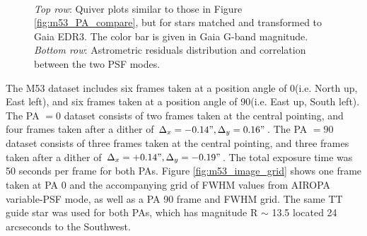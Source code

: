 \documentclass[]{spie}  %
\begin{document}
\begin{figure}[!h]
  \centering
  \\
  \hspace{-1cm}
  \caption{\textit{Top row}: Quiver plots similar to those in Figure \ref{fig:m53_PA_compare}, but for stars matched and transformed to Gaia EDR3. The color bar is given in Gaia G-band magnitude. \textit{Bottom row}: Astrometric residuals distribution and correlation between the two PSF modes.} \label{fig:m53_PA_compare_hst}
\end{figure}

The M53 dataset includes six frames taken at a position angle of 0\degree (i.e. North up, East left), and six frames taken at a position angle of 90\degree (i.e. East up, South left). The PA $=0$ dataset consists of two frames taken at the central pointing, and four frames taken after a dither of $\Delta_x = -0.14", \Delta_y = 0.16"$. The PA $=90$ dataset consists of three frames taken at the central pointing, and three frames taken after a dither of $\Delta_x = +0.14", \Delta_y = -0.19"$. The total exposure time was 50 seconds per frame for both PAs. Figure \ref{fig:m53_image_grid} shows one frame taken at PA 0 and the accompanying grid of FWHM values from AIROPA variable-PSF mode, as well as a PA 90 frame and FWHM grid. The same TT guide star was used for both PAs, which has magnitude R ${\sim}$ 13.5 located 24 arcseconds to the Southwest.
\end{document}
